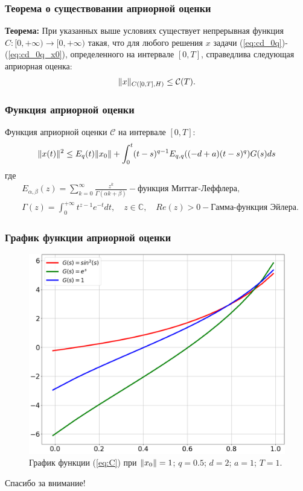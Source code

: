 \documentclass{beamer}
\DeclarePairedDelimiter{\norm}{\lVert}{\rVert}
\begin{document}
    \begin{frame}
        \frametitle{Теорема о существовании априорной оценки}
        \textbf{Теорема:}
        При указанных выше условиях существует непрерывная функция $C: [0, +\infty) \rightarrow [0, +\infty)$ такая,
        что для любого решения $x$ задачи (\ref{eq:cd_0q})-(\ref{eq:cd_0q_x0}), определенного на интервале $[0, T]$,
        справедлива следующая априорная оценка:
        $$\norm{x}_{C([0, T], H)} \leq \mathcal{C}(T).$$
    \end{frame}

    \begin{frame}
        \frametitle{Функция априорной оценки}
        Функция априорной оценки $\mathcal{C}$ на интервале $[0, T]$:
        \begin{equation}
            \label{eq:C}
            \norm{x(t)}^2 \leq E_q(t)\norm{x_0} + \int_0^t (t-s)^{q-1} E_{q,q}((-d+a)(t-s)^q)G(s)ds
        \end{equation}
        где
        \begin{equation*}
            \begin{aligned}
                &E_{\alpha, \beta}(z) = \sum_{k=0}^\infty \frac{z^k}{\Gamma (\alpha k + \beta)} - \text{функция Миттаг-Леффлера,}\\
                &\Gamma(z) = \int_0^{+\infty} t^{z-1} e^{-t} dt, \quad z \in \mathbb{C}, \quad Re(z) > 0 - \text{Гамма-функция Эйлера.}
            \end{aligned}
        \end{equation*}
    \end{frame}

    \begin{frame}
        \frametitle{График функции априорной оценки}
        \begin{figure}
            \includegraphics[width=0.75\linewidth]{plot}
            \caption{График функции (\ref{eq:C}) при $\norm{x_0} = 1$; $q = 0.5$; $d = 2$; $a = 1$; $T = 1$.}
        \end{figure}
    \end{frame}

    \begin{frame}
        \begin{block}{}
            \centerline{\color{blue}Спасибо за внимание!}
        \end{block}
    \end{frame}
\end{document}
